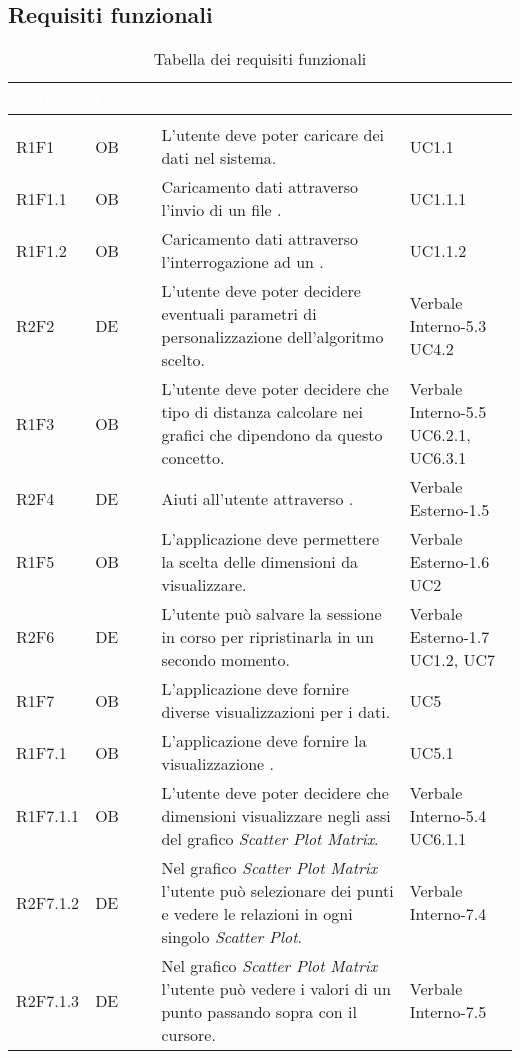 \subsection{Requisiti funzionali}
\renewcommand{\arraystretch}{1.5}
{
\setlength\arrayrulewidth{1pt}
\begin{longtable}{C{2cm} | C{1.5cm} | C{9cm} | C{3.3cm}}
		\textcolor{white}{\textbf{Codice}} & 
		\textcolor{white}{\textbf{Classe}} & 
		\textcolor{white}{\textbf{Descrizione}} & 
		\textcolor{white}{\textbf{Fonti}} \\
		\endfirsthead
	    \\
	    \endfoot
	    \caption{Tabella dei requisiti funzionali}
	    \endlastfoot

R1F1 & OB & L'utente deve poter caricare dei dati nel sistema. & UC1.1\\
R1F1.1 & OB & Caricamento dati attraverso l'invio di un file . & UC1.1.1\\
R1F1.2 & OB & Caricamento dati attraverso l'interrogazione ad un . & UC1.1.2\\

R2F2 & DE & L'utente deve poter decidere eventuali parametri di personalizzazione dell'algoritmo scelto. & Verbale Interno-5.3 \newline UC4.2\\

R1F3 & OB & L'utente deve poter decidere che tipo di distanza calcolare nei grafici che dipendono da questo concetto. & Verbale Interno-5.5 \newline UC6.2.1, UC6.3.1\\

R2F4 & DE & Aiuti all'utente attraverso . & Verbale Esterno-1.5 \\
R1F5 & OB & L'applicazione deve permettere la scelta delle dimensioni da visualizzare. & Verbale Esterno-1.6 \newline UC2\\
R2F6 & DE & L'utente può salvare la sessione in corso per ripristinarla in un secondo momento. & Verbale Esterno-1.7 \newline UC1.2, UC7\\
R1F7 & OB & L'applicazione deve fornire diverse visualizzazioni per i dati. & UC5\\
R1F7.1 & OB & L'applicazione deve fornire la visualizzazione . & UC5.1\\
R1F7.1.1 & OB & L'utente deve poter decidere che dimensioni visualizzare negli assi del grafico \textit{Scatter Plot Matrix}. & Verbale Interno-5.4 \newline UC6.1.1\\
R2F7.1.2 & DE & Nel grafico \textit{Scatter Plot Matrix} l'utente può selezionare dei punti e vedere le relazioni in ogni singolo \textit{Scatter Plot}. & Verbale Interno-7.4\\
R2F7.1.3 & DE & Nel grafico \textit{Scatter Plot Matrix} l'utente può vedere i valori di un punto passando sopra con il cursore. & Verbale Interno-7.5\\


\end{longtable}}
